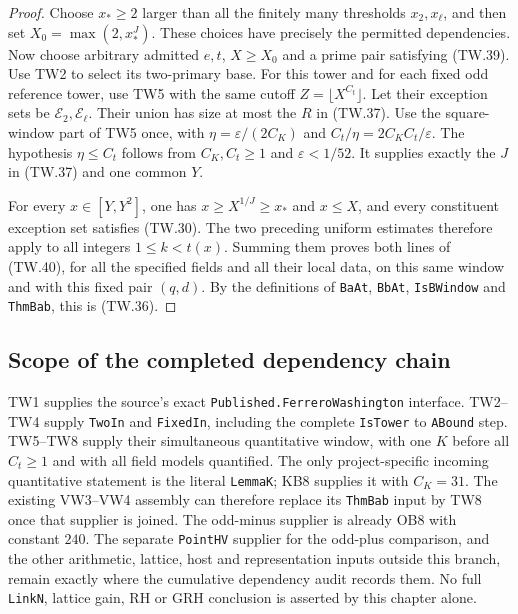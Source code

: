 \begin{proof}
Choose $x_*\ge2$ larger than all the finitely many thresholds
$x_2,x_\ell$, and then set $X_0=\max(2,x_*^J)$.
These choices have precisely the permitted dependencies.
Now choose arbitrary admitted $e,t$, $X\ge X_0$ and a prime
pair satisfying (TW.39).  Use TW2 to select its two-primary
base.  For this tower and for each fixed odd reference tower,
use TW5 with the same cutoff $Z=\lfloor X^{C_t}\rfloor$.
Let their exception sets be $\mathcal E_2,\mathcal E_\ell$.
Their union has size at most the $R$ in (TW.37).
Use the square-window part of TW5 once, with
$\eta=\varepsilon/(2C_K)$ and $C_t/\eta=
2C_KC_t/\varepsilon$.
The hypothesis $\eta\le C_t$ follows from
$C_K,C_t\ge1$ and $\varepsilon<1/52$.
It supplies exactly the $J$ in (TW.37) and one common $Y$.

For every $x\in[Y,Y^2]$, one has
$x\ge X^{1/J}\ge x_*$ and $x\le X$, and every constituent
exception set satisfies (TW.30).  The two preceding uniform
estimates therefore apply to all integers $1\le k<t(x)$.
Summing them proves both lines of (TW.40), for all the
specified fields and all their local data, on this same
window and with this fixed pair $(q,d)$.
By the definitions of \texttt{BaAt}, \texttt{BbAt},
\texttt{IsBWindow} and \texttt{ThmBab}, this is (TW.36).
\end{proof}

\subsection{Scope of the completed dependency chain}

TW1 supplies the source's exact
\texttt{Published.FerreroWashington} interface.
TW2--TW4 supply \texttt{TwoIn} and \texttt{FixedIn}, including
the complete \texttt{IsTower} to \texttt{ABound} step.
TW5--TW8 supply their simultaneous quantitative window, with one
$K$ before all $C_t\ge1$ and with all field models quantified.
The only project-specific incoming quantitative statement is
the literal \texttt{LemmaK}; KB8 supplies it with $C_K=31$.
The existing VW3--VW4 assembly can therefore replace its
\texttt{ThmBab} input by TW8 once that supplier is joined.
The odd-minus supplier is already OB8 with constant $240$.
The separate \texttt{PointHV} supplier for the odd-plus comparison,
and the other arithmetic, lattice, host and representation inputs
outside this branch, remain exactly where the cumulative dependency
audit records them.  No full \texttt{LinkN}, lattice gain, RH or
GRH conclusion is asserted by this chapter alone.

